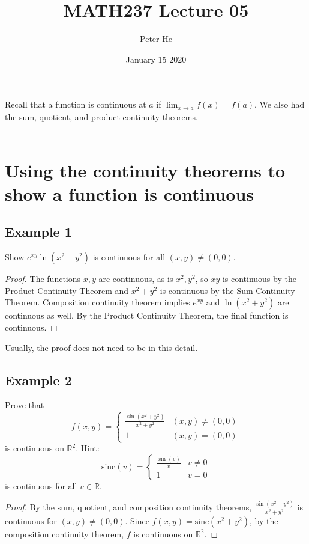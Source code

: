 \documentclass[12pt]{article}
\title{MATH237 Lecture 05}
\author{Peter He}
\date{January 15 2020}
\theoremstyle{definition}
\newcommand{\R}{\mathbb{R}}
\begin{document}
\maketitle

Recall that a function is continuous at $\underline a$ if $\lim_{\underline x\to\underline a} f(\underline x)=f(\underline a)$. We also had the sum, quotient, and product continuity theorems.\\\\
\section*{Using the continuity theorems to show a function is continuous}
\subsection*{Example 1}
Show $e^{xy}\ln(x^2+y^2)$ is continuous for all $(x,y)\neq (0,0)$.
\begin{proof}
    The functions $x,y$ are continuous, as is $x^2,y^2$, so $xy$ is continuous by the Product Continuity Theorem and $x^2+y^2$ is continuous by the Sum Continuity Theorem. Composition continuity theorem implies $e^{xy}$ and $\ln(x^2+y^2)$ are continuous as well. By the Product Continuity Theorem, the final function is continuous.
\end{proof}
Usually, the proof does not need to be in this detail.

\subsection*{Example 2}
Prove that \[f(x,y)=\begin{cases}\frac{\sin(x^2+y^2)}{x^2+y^2}&(x,y)\neq (0,0)\\1&(x,y)=(0,0)\end{cases}\] is continuous on $\R^2$. Hint: \[\text{sinc}(v)=\begin{cases}\frac{\sin(v)}{v}&v\neq 0\\1&v=0\end{cases}\] is continuous for all $v\in\R$.

\begin{proof}
    By the sum, quotient, and composition continuity theorems, $\frac{\sin(x^2+y^2)}{x^2+y^2}$ is continuous for $(x,y)\neq (0,0)$. Since $f(x,y)=\text{sinc}(x^2+y^2)$, by the composition continuity theorem, $f$ is continuous on $\R^2$.
\end{proof}
\end{document}
